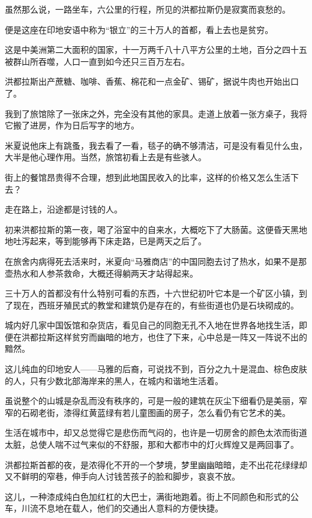 \par 虽然那么说，一路坐车，六公里的行程，所见的洪都拉斯仍是寂寞而哀愁的。
\par 便是这座在印地安语中称为“银立”的三十万人的首都，看上去也是贫穷。
\par 这是中美洲第二大面积的国家，十一万两千八十八平方公里的土地，百分之四十五被群山所吞噬，人口一直到如今还只三百万左右。
\par 洪都拉斯出产蔗糖、咖啡、香蕉、棉花和一点金矿、锡矿，据说牛肉也开始出口了。
\par 我到了旅馆除了一张床之外，完全没有其他的家具。走道上放着一张方桌子，我将它搬了进房，作为日后写字的地方。
\par 米夏说他床上有跳蚤，我去看了一看，毯子的确不够清洁，可是没有看见什么虫，大半是他心理作用。当然，旅馆初看上去是有些骇人。
\par 街上的餐馆昂贵得不合理，想到此地国民收入的比率，这样的价格又怎么生活下去？
\par 走在路上，沿途都是讨钱的人。
\par 初来洪都拉斯的第一夜，喝了浴室中的自来水，大概吃下了大肠菌。这便昏天黑地地吐泻起来，等到能够再下床走路，已是两天之后了。
\par 在旅舍内病得死去活来时，米夏向“马雅商店”的中国同胞去讨了热水，如果不是那壶热水和人参茶救命，大概还得躺两天才站得起来。
\par 三十万人的首都没有什么特别可看的东西，十六世纪初叶它本是一个矿区小镇，到了现在，西班牙殖民式的教堂和建筑仍是存在的，有些街道也仍是石块砌成的。
\par 城内好几家中国饭馆和杂货店，看见自己的同胞无孔不入地在世界各地找生活，即便在洪都拉斯这样贫穷而幽暗的地方，也住了下来，心中总是一阵又一阵说不出的黯然。
\par 这儿纯血的印地安人——马雅的后裔，可说找不到，百分之九十是混血、棕色皮肤的人，只有少数北部海岸来的黑人，在城内和谐地生活着。
\par 虽说整个的山城是杂乱而没有秩序的，可是一般的建筑在灰尘下细看仍是美丽，窄窄的石砌老街，漆得红黄蓝绿有若儿童图画的房子，怎么看仍有它艺术的美。
\par 生活在城市中，却又总觉得它是悲伤而气闷的，也许是一切房舍的颜色太浓而街道太脏，总使人喘不过气来似的不舒服，那和大都市中的灯火辉煌又是两回事了。
\par 洪都拉斯首都的夜，是浓得化不开的一个梦境，梦里幽幽暗暗，走不出花花绿绿却又不鲜明的窄巷，伸手向人讨钱苦孩子的脸和脚步，哀哀不放。
\par 这儿，一种漆成纯白色加红杠的大巴士，满街地跑着。街上不同颜色和形式的公车，川流不息地在载人，他们的交通出人意料的方便快捷。
